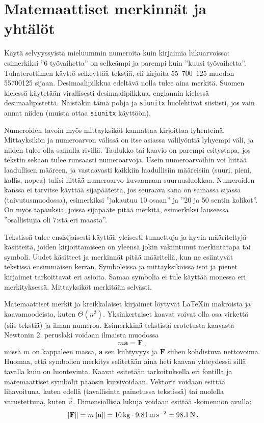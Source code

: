 \section{Matemaattiset merkinnät ja yhtälöt}

Käytä selvyyssyistä mieluummin numeroita kuin kirjaimia lukuarvoissa: esimerkiksi ''6 työvaihetta'' on selkeämpi ja parempi kuin ''kuusi työvaihetta''. Tuhaterottimen käyttö selkeyttää tekstiä, eli kirjoita 55~700~125 muodon 55700125 sijaan. Desimaalipilkkua edeltävä nolla tulee aina merkitä. Suomen kielessä käytetään virallisesti desimaalipilkkua, englannin kielessä desimaalipistettä. Näistäkin tämä pohja ja \texttt{siunitx} \parencite{siunitx} huolehtivat siististi, jos vain annat niiden (muista ottaa \texttt{siunitx} käyttöön).

Numeroiden tavoin myös mittayksiköt kannattaa kirjoittaa lyhenteinä. Mittayksikön ja numeroarvon välissä on itse asiassa välilyöntiä lyhyempi väli, ja niiden tulee olla samalla rivillä. Taulukko tai kaavio on parempi esitystapa, jos tekstin sekaan tulee runsaasti numeroarvoja. Usein numeroarvoihin voi liittää laadullisen määreen, ja vastaavasti kaikkiin laadullisiin määreisiin (suuri, pieni, kallis, nopea) tulisi liittää numeroarvo kuvaamaan suuruusluokkaa. Numeroiden kanssa ei tarvitse käyttää sijapäätettä, jos seuraava sana on samassa sijassa (taivutusmuodossa), esimerkiksi ''jakautuu 10 osaan'' ja ''20 ja 50 sentin kolikot''. On myös tapauksia, joissa sijapääte pitää merkitä, esimerkiksi lauseessa ''osallistujia oli 7:stä eri maasta''.

Tekstissä tulee ensisijaisesti käyttää yleisesti tunnettuja ja hyvin määriteltyjä käsitteitä, joiden kirjoittamiseen on yleensä jokin vakiintunut merkintätapa tai symboli. Uudet käsitteet ja merkinnät pitää määritellä, kun ne esiintyvät tekstissä ensimmäisen kerran. Symboleissa ja mittayksiköissä isot ja pienet kirjaimet tarkoittavat eri asioita. Samaa symbolia ei tule käyttää monessa eri merkityksessä. Mittayksiköt merkitään selvästi.

Matemaattiset merkit ja kreikkalaiset kirjaimet löytyvät \LaTeX{}in makroista ja kaavamoodeista, kuten \(\Theta(n^2)\). Yksinkertaiset kaavat voivat olla osa virkettä (siis tekstiä) ja ilman numeroa. Esimerkkinä tekstistä erotetusta kaavasta Newtonin 2. peruslaki voidaan ilmaista muodossa
\begin{equation}\label{eq:newton2}
    m\mathbf{a} = \mathbf{F} \,,
\end{equation}
missä \(m\) on kappaleen massa, \(\mathbf{a}\) sen kiihtyvyys ja \(\mathbf{F}\) siihen kohdistuva nettovoima. Huomaa, että symbolien merkitys selitetään aina heti kaavan yhteydessä sillä tavalla kuin on luontevinta. Kaavat esitetään tarkoituksella eri fontilla ja matemaattiset symbolit pääosin kursivoidaan. Vektorit voidaan esittää lihavoituna, kuten edellä (tavallisinta painetussa tekstissä) tai nuolella varustettuna, kuten \(\vec{v}\). Dimensiollisia lukuja voidaan esittää -komennon avulla:
\begin{equation*}
    \lVert\mathbf{F}\rVert
    =
    m\lVert\mathbf{a}\rVert
    =
    \SI{10}{\kilogram} \cdot \SI{9.81}{\metre\per\second\squared}
    =
    \SI{98.1}{\newton} \,.
\end{equation*}

